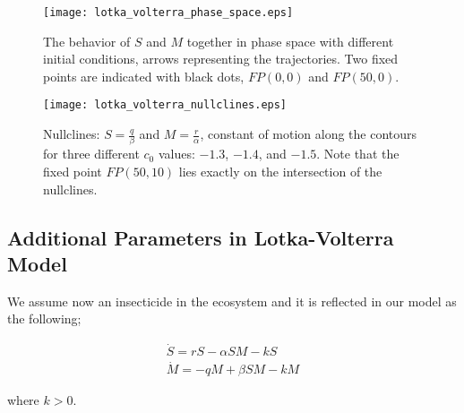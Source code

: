 \documentclass[12pt]{article}
\begin{document}
\begin{figure}[h!]
	\centering
	\texttt{[image: lotka\_volterra\_phase\_space.eps]}
		\caption{The behavior of $S$ and $M$ together in phase space with different initial conditions, arrows representing the trajectories. Two fixed points are indicated with black dots, $FP(0,0)$ and $FP(50,0)$.}
\end{figure}

\begin{figure}[h!]
	\centering
	\texttt{[image: lotka\_volterra\_nullclines.eps]}
		\caption{Nullclines: $S=\frac{q}{\beta}$ and $M=\frac{r}{\alpha}$, constant of motion along the contours for three different $c_0$ values: $-1.3$, $-1.4$, and $-1.5$. Note that the fixed point $FP(50,10)$ lies exactly on the intersection of the nullclines.}
\end{figure}

\subsection{Additional Parameters in Lotka-Volterra Model}

We assume now an insecticide in the ecosystem and it is reflected in our model as the following;

\begin{subequations}
 \begin{align}\dot{S} = rS - \alpha SM  -kS\label{eqn: frobenius 1}\\  \dot{M} = -qM + \beta SM -kM \label{eqn: frobenius 2} 
 \end{align} 
\end{subequations}

where $k>0$. 
\end{document}
